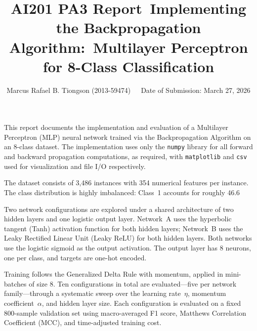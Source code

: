 \documentclass{acm_proc_article-sp} \usepackage{graphicx} \usepackage{amsmath} \usepackage{booktabs} \usepackage{url}
\begin{document}
 \title{AI201 PA3 Report\ Implementing the Backpropagation Algorithm:\ Multilayer Perceptron for 8-Class Classification}

 \author{ \alignauthor Marcus Rafael B. Tiongson (2013-59474)\ ~\ Date of Submission: March 27, 2026 }

\maketitle


This report documents the implementation and evaluation of a Multilayer Perceptron (MLP) neural network trained via the Backpropagation Algorithm on an 8-class dataset. The implementation uses only the \texttt{numpy} library for all forward and backward propagation computations, as required, with \texttt{matplotlib} and \texttt{csv} used for visualization and file I/O respectively.

The dataset consists of 3,486 instances with 354 numerical features per instance. The class distribution is highly imbalanced: Class~1 accounts for roughly 46.6%

Two network configurations are explored under a shared architecture of two hidden layers and one logistic output layer. Network~A uses the hyperbolic tangent (Tanh) activation function for both hidden layers; Network~B uses the Leaky Rectified Linear Unit (Leaky ReLU) for both hidden layers. Both networks use the logistic sigmoid as the output activation. The output layer has 8 neurons, one per class, and targets are one-hot encoded.

Training follows the Generalized Delta Rule with momentum, applied in mini-batches of size 8. Ten configurations in total are evaluated---five per network family---through a systematic sweep over the learning rate~$\eta$, momentum coefficient~$\alpha$, and hidden layer size. Each configuration is evaluated on a fixed 800-sample validation set using macro-averaged F1 score, Matthews Correlation Coefficient (MCC), and time-adjusted training cost.
\end{document}

